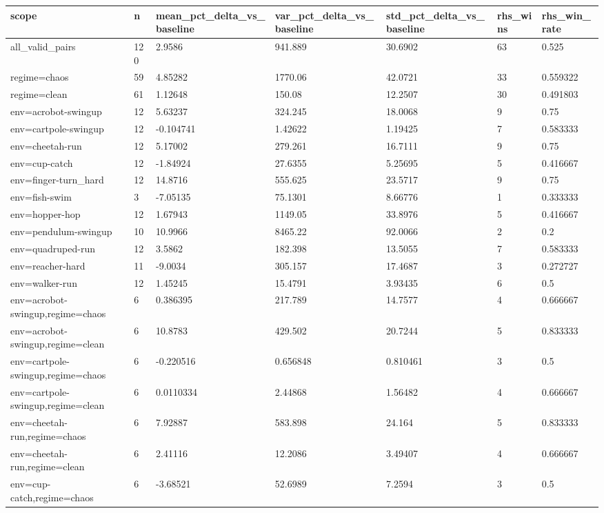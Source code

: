 \begin{tabular}{lllllll}
\toprule
scope & n & mean\_pct\_delta\_vs\_baseline & var\_pct\_delta\_vs\_baseline & std\_pct\_delta\_vs\_baseline & rhs\_wins & rhs\_win\_rate \\
\midrule
all\_valid\_pairs & 120 & 2.9586 & 941.889 & 30.6902 & 63 & 0.525 \\
regime=chaos & 59 & 4.85282 & 1770.06 & 42.0721 & 33 & 0.559322 \\
regime=clean & 61 & 1.12648 & 150.08 & 12.2507 & 30 & 0.491803 \\
env=acrobot-swingup & 12 & 5.63237 & 324.245 & 18.0068 & 9 & 0.75 \\
env=cartpole-swingup & 12 & -0.104741 & 1.42622 & 1.19425 & 7 & 0.583333 \\
env=cheetah-run & 12 & 5.17002 & 279.261 & 16.7111 & 9 & 0.75 \\
env=cup-catch & 12 & -1.84924 & 27.6355 & 5.25695 & 5 & 0.416667 \\
env=finger-turn\_hard & 12 & 14.8716 & 555.625 & 23.5717 & 9 & 0.75 \\
env=fish-swim & 3 & -7.05135 & 75.1301 & 8.66776 & 1 & 0.333333 \\
env=hopper-hop & 12 & 1.67943 & 1149.05 & 33.8976 & 5 & 0.416667 \\
env=pendulum-swingup & 10 & 10.9966 & 8465.22 & 92.0066 & 2 & 0.2 \\
env=quadruped-run & 12 & 3.5862 & 182.398 & 13.5055 & 7 & 0.583333 \\
env=reacher-hard & 11 & -9.0034 & 305.157 & 17.4687 & 3 & 0.272727 \\
env=walker-run & 12 & 1.45245 & 15.4791 & 3.93435 & 6 & 0.5 \\
env=acrobot-swingup,regime=chaos & 6 & 0.386395 & 217.789 & 14.7577 & 4 & 0.666667 \\
env=acrobot-swingup,regime=clean & 6 & 10.8783 & 429.502 & 20.7244 & 5 & 0.833333 \\
env=cartpole-swingup,regime=chaos & 6 & -0.220516 & 0.656848 & 0.810461 & 3 & 0.5 \\
env=cartpole-swingup,regime=clean & 6 & 0.0110334 & 2.44868 & 1.56482 & 4 & 0.666667 \\
env=cheetah-run,regime=chaos & 6 & 7.92887 & 583.898 & 24.164 & 5 & 0.833333 \\
env=cheetah-run,regime=clean & 6 & 2.41116 & 12.2086 & 3.49407 & 4 & 0.666667 \\
env=cup-catch,regime=chaos & 6 & -3.68521 & 52.6989 & 7.2594 & 3 & 0.5 \\

\end{tabular}
